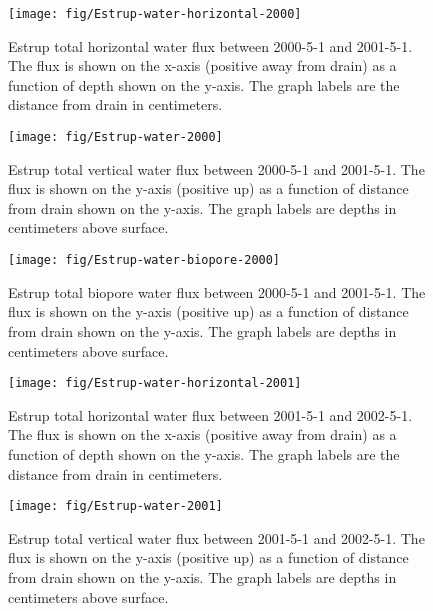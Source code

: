 \begin{figure}[htbp]
  \centering
  \texttt{[image: fig/Estrup-water-horizontal-2000]}
  
  \caption{Estrup total horizontal water flux between 2000-5-1 and
    2001-5-1.  The flux is shown on the x-axis (positive away from
    drain) as a function of depth shown on the y-axis.  The graph
    labels are the distance from drain in centimeters.}
  \label{fig:Estrup-water-2000-horizontal}
\end{figure}\FloatBarrier

\begin{figure}[htbp]
  \centering
  \texttt{[image: fig/Estrup-water-2000]}
  
  \caption{Estrup total vertical water flux between 2000-5-1 and
    2001-5-1.  The flux is shown on the y-axis (positive up) as a
    function of distance from drain shown on the y-axis.  The graph
    labels are depths in centimeters above surface.}
  \label{fig:Estrup-water-2000}
\end{figure}\FloatBarrier

\begin{figure}[htbp]
  \centering
  \texttt{[image: fig/Estrup-water-biopore-2000]}
  
  \caption{Estrup total biopore water flux between 2000-5-1 and
    2001-5-1.  The flux is shown on the y-axis (positive up) as a
    function of distance from drain shown on the y-axis.  The graph
    labels are depths in centimeters above surface.}
  \label{fig:Estrup-water-biopore-2000}
\end{figure}\FloatBarrier

\begin{figure}[htbp]
  \centering
  \texttt{[image: fig/Estrup-water-horizontal-2001]}
  
  \caption{Estrup total horizontal water flux between 2001-5-1 and
    2002-5-1.  The flux is shown on the x-axis (positive away from
    drain) as a function of depth shown on the y-axis.  The graph
    labels are the distance from drain in centimeters.}
  \label{fig:Estrup-water-2001-horizontal}
\end{figure}\FloatBarrier

\begin{figure}[htbp]
  \centering
  \texttt{[image: fig/Estrup-water-2001]}
  
  \caption{Estrup total vertical water flux between 2001-5-1 and
    2002-5-1.  The flux is shown on the y-axis (positive up) as a
    function of distance from drain shown on the y-axis.  The graph
    labels are depths in centimeters above surface.}
  \label{fig:Estrup-water-2001}
\end{figure}\FloatBarrier

